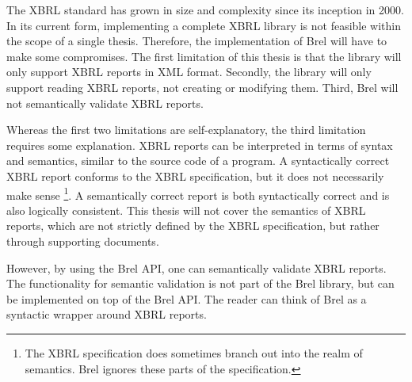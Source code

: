 The XBRL standard has grown in size and complexity since its inception in 2000.
In its current form, implementing a complete XBRL library is not feasible within the scope of a single thesis.
Therefore, the implementation of Brel will have to make some compromises.
The first limitation of this thesis is that the library will only support XBRL reports in XML format.
Secondly, the library will only support reading XBRL reports, not creating or modifying them.
Third, Brel will not semantically validate XBRL reports.

Whereas the first two limitations are self-explanatory, the third limitation requires some explanation.
XBRL reports can be interpreted in terms of syntax and semantics, similar to the source code of a program.
A syntactically correct XBRL report conforms to the XBRL specification, but it does not necessarily make sense
\footnote{The XBRL specification does sometimes branch out into the realm of semantics. Brel ignores these parts of the specification.}.
A semantically correct report is both syntactically correct and is also logically consistent.
This thesis will not cover the semantics of XBRL reports, which are not strictly defined by the XBRL specification, but rather through supporting documents.

However, by using the Brel API, one can semantically validate XBRL reports.
The functionality for semantic validation is not part of the Brel library, but can be implemented on top of the Brel API.
The reader can think of Brel as a syntactic wrapper around XBRL reports.

